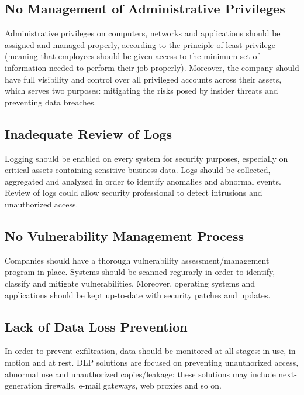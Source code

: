 	\subsection{No Management of Administrative Privileges}
	Administrative privileges on computers, networks and applications should be assigned and managed properly, according to the principle of least privilege (meaning that employees should be given access to the minimum set of information needed to perform their job properly). Moreover, the company should have full visibility and control over all privileged accounts across their assets, which serves two purposes: mitigating the risks posed by insider threats and preventing data breaches.
	\subsection{Inadequate Review of Logs}
	Logging should be enabled on every system for security purposes, especially on critical assets containing sensitive business data. Logs should be collected, aggregated and analyzed in order to identify anomalies and abnormal events. Review of logs could allow security professional to detect intrusions and unauthorized access.
	\subsection{No Vulnerability Management Process}
	Companies should have a thorough vulnerability assessment/management program in place. Systems should be scanned regurarly in order to identify, classify and mitigate vulnerabilities. Moreover, operating systems and applications should be kept up-to-date with security patches and updates.
	\subsection{Lack of Data Loss Prevention}
	In order to prevent exfiltration, data should be monitored at all stages: in-use, in-motion and at rest. DLP solutions are focused on preventing unauthorized access, abnormal use and unauthorized copies/leakage: these solutions may include next-generation firewalls, e-mail gateways, web proxies and so on.